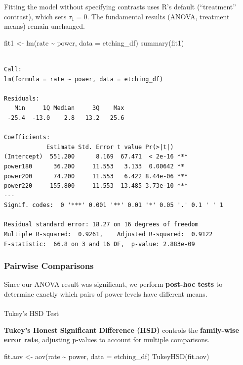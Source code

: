 \documentclass[
  letterpaper,
]{scrbook}
\makeatletter
\let\oldparagraph\paragraph
\renewcommand{\paragraph}{
    \@ifstar
      \xxxParagraphStar
      \xxxParagraphNoStar
  }
\newcommand{\xxxParagraphStar}[1]{\oldparagraph*{#1}\mbox{}}
\newcommand{\xxxParagraphNoStar}[1]{\oldparagraph{#1}\mbox{}}
\newenvironment{Shaded}{\begin{snugshade}}{\end{snugshade}}
\newcommand{\AttributeTok}[1]{\textcolor[rgb]{0.40,0.45,0.13}{#1}}
\newcommand{\FunctionTok}[1]{\textcolor[rgb]{0.28,0.35,0.67}{#1}}
\newcommand{\NormalTok}[1]{\textcolor[rgb]{0.00,0.23,0.31}{#1}}
\newcommand{\OtherTok}[1]{\textcolor[rgb]{0.00,0.23,0.31}{#1}}
\newcommand{\SpecialCharTok}[1]{\textcolor[rgb]{0.37,0.37,0.37}{#1}}
\makeatother
\begin{document}
Fitting the model without specifying contrasts uses R's default
(``treatment'' contrast), which sets \(\tau_1 = 0\). The fundamental
results (ANOVA, treatment means) remain unchanged.

\begin{Shaded}
\begin{Highlighting}[]
\NormalTok{fit1 }\OtherTok{\textless{}{-}} \FunctionTok{lm}\NormalTok{(rate }\SpecialCharTok{\textasciitilde{}}\NormalTok{ power, }\AttributeTok{data =}\NormalTok{ etching\_df)}
\FunctionTok{summary}\NormalTok{(fit1)}
\end{Highlighting}
\end{Shaded}

\begin{verbatim}

Call:
lm(formula = rate ~ power, data = etching_df)

Residuals:
   Min     1Q Median     3Q    Max 
 -25.4  -13.0    2.8   13.2   25.6 

Coefficients:
            Estimate Std. Error t value Pr(>|t|)    
(Intercept)  551.200      8.169  67.471  < 2e-16 ***
power180      36.200     11.553   3.133  0.00642 ** 
power200      74.200     11.553   6.422 8.44e-06 ***
power220     155.800     11.553  13.485 3.73e-10 ***
---
Signif. codes:  0 '***' 0.001 '**' 0.01 '*' 0.05 '.' 0.1 ' ' 1

Residual standard error: 18.27 on 16 degrees of freedom
Multiple R-squared:  0.9261,    Adjusted R-squared:  0.9122 
F-statistic:  66.8 on 3 and 16 DF,  p-value: 2.883e-09
\end{verbatim}

\subsubsection{Pairwise Comparisons}\label{pairwise-comparisons}

Since our ANOVA result was significant, we perform \textbf{post-hoc
tests} to determine exactly which pairs of power levels have different
means.

\paragraph{Tukey's HSD Test}\label{tukeys-hsd-test}

\textbf{Tukey's Honest Significant Difference (HSD)} controls the
\textbf{family-wise error rate}, adjusting p-values to account for
multiple comparisons.

\begin{Shaded}
\begin{Highlighting}[]
\NormalTok{fit.aov }\OtherTok{\textless{}{-}} \FunctionTok{aov}\NormalTok{(rate }\SpecialCharTok{\textasciitilde{}}\NormalTok{ power, }\AttributeTok{data =}\NormalTok{ etching\_df)}
\FunctionTok{TukeyHSD}\NormalTok{(fit.aov)}
\end{Highlighting}
\end{Shaded}
\end{document}
